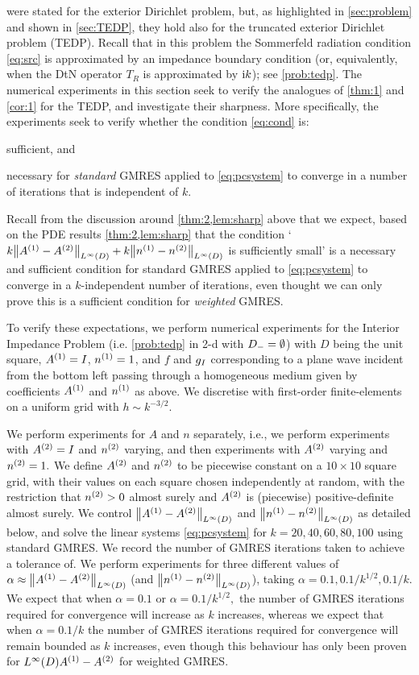  were stated for the exterior Dirichlet problem, but, as highlighted in \cref{sec:problem} and shown in \cref{sec:TEDP}, they hold also for the truncated exterior Dirichlet problem (TEDP). Recall that in this problem the Sommerfeld radiation condition \cref{eq:src} is approximated by an impedance boundary condition (or, equivalently, when the DtN operator $T_R$ is approximated by $\mathrm{i} k$); see \cref{prob:tedp}. The numerical experiments in this section seek to verify the analogues of \cref{thm:1} and \cref{cor:1} for the TEDP, and investigate their sharpness. More specifically, the experiments seek to verify whether the condition \cref{eq:cond} is:
\ben
\item sufficient, and
\item necessary
  \een
  for \emph{standard} GMRES applied to \cref{eq:pcsystem} to converge in a number of iterations that is independent of $k.$

  Recall from the discussion around \cref{thm:2,lem:sharp} above that we expect, based on the PDE results \cref{thm:2,lem:sharp} that the condition `$k\NLiD{\Aso-\Ast} + k\NLiD{\nso-\nst}$ is sufficiently small' is a necessary and sufficient condition for standard GMRES applied to \cref{eq:pcsystem} to converge in a $k$-independent number of iterations, even thought we can only prove this is a sufficient condition for \emph{weighted} GMRES.

  To verify these expectations, we perform numerical experiments for the Interior Impedance Problem (i.e. \cref{prob:tedp} in 2-d with $D_{-} = \emptyset$) with $D$ being the unit square, ${A}^{(1)} = I$, ${n}^{(1)} = 1$, and $f$ and $g_{I}$ corresponding to a plane wave incident from the bottom left passing through a homogeneous medium given by coefficients ${A}^{(1)}$ and ${n}^{(1)}$ as above. We discretise with first-order finite-elements on a uniform grid with $h \sim k^{-3/2}.$

  We perform experiments for $A$ and $n$ separately, i.e., we perform experiments with ${A}^{(2)}=I$ and ${n}^{(2)}$ varying, and then experiments with ${A}^{(2)}$ varying and ${n}^{(2)}=1.$ We define ${A}^{(2)}$ and ${n}^{(2)}$ to be piecewise constant on a $10\times10$ square grid, with their values on each square chosen independently at random, with the restriction that ${n}^{(2)} > 0$ almost surely and ${A}^{(2)}$ is (piecewise) positive-definite almost surely. We control $\NLiD{\Aso-\Ast}$ and $\NLiD{\nso-\nst}$ as detailed below, and solve the linear systems \cref{eq:pcsystem} for $k = 20,40,60,80,100$ using standard GMRES. We record the number of GMRES iterations taken to achieve a tolerance of. We perform experiments for three different values of $\alpha\approx\NLiD{\Aso-\Ast}$ (and $\NLiD{\nso-\nst}$), taking $\alpha = 0.1, 0.1/k^{1/2}, 0.1/k.$ We expect that when $\alpha = 0.1$ or $\alpha = 0.1/k^{1/2},$ the number of GMRES iterations required for convergence will increase as $k$ increases, whereas we expect that when $\alpha = 0.1/k$ the number of GMRES iterations required for convergence will remain bounded as $k$ increases, even though this behaviour has only been proven for $\LiD{\Aso-\Ast}$ for weighted GMRES.

